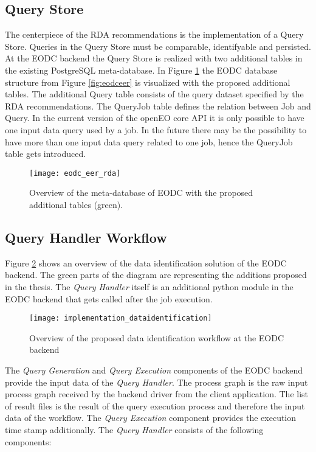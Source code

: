 \documentclass[draft,final]{vutinfth} %
\begin{document}
\subsection{Query Store}
The centerpiece of the RDA recommendations is the implementation of a Query Store. Queries in the Query Store must be comparable, identifyable and persisted. At the EODC backend the Query Store is realized with two additional tables in the existing PostgreSQL meta-database. In Figure \ref{fig:eer_rda} the EODC database structure from Figure \ref{fig:eodceer} is visualized with the proposed additional tables. The additional Query table consists of the query dataset specified by the RDA recommendations. The QueryJob table defines the relation between Job and Query. In the current version of the openEO core API it is only possible to have one input data query used by a job. In the future there may be the possibility to have more than one input data query related to one job, hence the QueryJob table gets introduced. 

\begin{figure}[h]
	\centering
	\texttt{[image: eodc\_eer\_rda]}
	\caption{Overview of the meta-database of EODC with the proposed additional tables (green).}
	\label{fig:eer_rda} %
\end{figure}

\subsection{Query Handler Workflow}
Figure \ref{fig:impldataid} shows an overview of the data identification solution of the EODC backend. The green parts of the diagram are representing the additions proposed in the thesis. The \textit{Query Handler} itself is an additional python module in the EODC backend that gets called after the job execution. 

\begin{figure}[h]
	\centering
	\texttt{[image: implementation\_dataidentification]}
	\caption{Overview of the proposed data identification workflow at the EODC backend}
	\label{fig:impldataid} %
\end{figure}


The \textit{Query Generation} and \textit{Query Execution} components of the EODC backend provide the input data of the \textit{Query Handler}. The process graph is the raw input process graph received by the backend driver from the client application. The list of result files is the result of the query execution process and therefore the input data of the workflow. The \textit{Query Execution} component provides the execution time stamp additionally. The \textit{Query Handler} consists of the following components:
\end{document}
